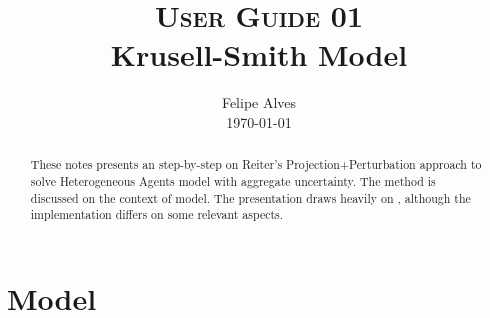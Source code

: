 \documentclass[a4paper,10pt]{article}  %
\title{\textsc{User Guide 01} \\ Krusell-Smith Model \vspace{-1.00em}}
\author{
        \normalfont\large Felipe Alves \\[-2.5pt]       \normalsize
        \today
}
\date{ \vspace{-3em} }
\begin{document}
\maketitle

\begin{abstract}
   These notes presents an step-by-step on Reiter's Projection+Perturbation approach to solve Heterogeneous Agents model with aggregate
   uncertainty. The method is discussed on the context of \citet{krusell_smith} model. The presentation draws heavily on
   \citet{winberry}, although the implementation differs on some relevant aspects.
\end{abstract}



\section{Model} %
\label{sec:model}
\end{document}
